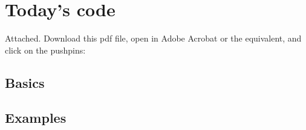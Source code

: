 \documentclass[11pt]{article}
\begin{document}
\section*{Today's code}

Attached.  Download this pdf file, open in Adobe Acrobat or the equivalent,
and click on the pushpins:

\subsection*{Basics}
{\small

}

\subsection*{Examples}

{\small

}
\end{document}
